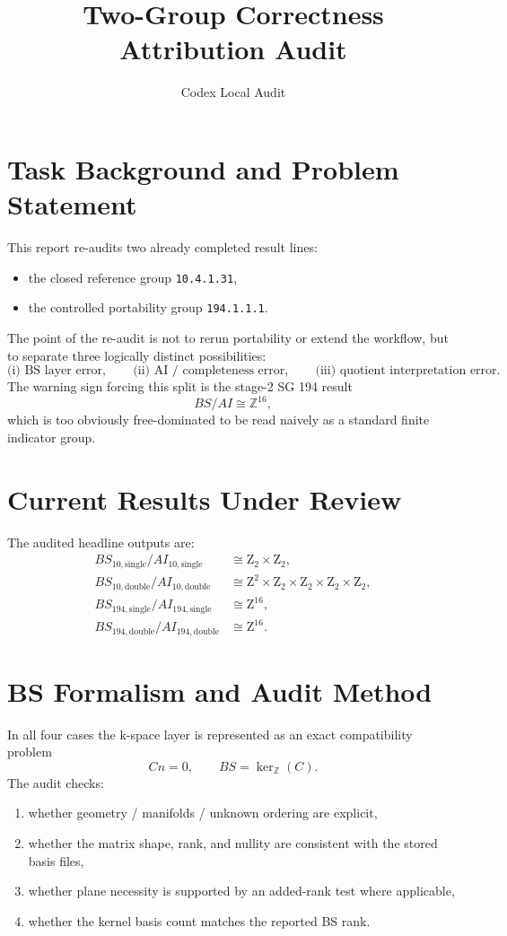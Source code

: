 \documentclass[11pt]{article}
\title{Two-Group Correctness Attribution Audit}
\author{Codex Local Audit}
\date{}
\begin{document}
\maketitle

\section{Task Background and Problem Statement}
This report re-audits two already completed result lines:
\begin{itemize}
\item the closed reference group \texttt{10.4.1.31},
\item the controlled portability group \texttt{194.1.1.1}.
\end{itemize}
The point of the re-audit is not to rerun portability or extend the workflow, but to separate three logically distinct possibilities:
\[
  \text{(i) BS layer error}, \qquad
  \text{(ii) AI / completeness error}, \qquad
  \text{(iii) quotient interpretation error}.
\]
The warning sign forcing this split is the stage-2 SG 194 result
\[
  BS/AI \cong \mathbb{Z}^{16},
\]
which is too obviously free-dominated to be read naively as a standard finite indicator group.

\section{Current Results Under Review}
The audited headline outputs are:
\begin{align*}
  BS_{10,\mathrm{single}}/AI_{10,\mathrm{single}} &\cong \mathrm{Z}_{2} \times \mathrm{Z}_{2}, \\
  BS_{10,\mathrm{double}}/AI_{10,\mathrm{double}} &\cong \mathrm{Z}^{2} \times \mathrm{Z}_{2} \times \mathrm{Z}_{2} \times \mathrm{Z}_{2} \times \mathrm{Z}_{2}, \\
  BS_{194,\mathrm{single}}/AI_{194,\mathrm{single}} &\cong \mathrm{Z}^{16}, \\
  BS_{194,\mathrm{double}}/AI_{194,\mathrm{double}} &\cong \mathrm{Z}^{16}.
\end{align*}

\section{BS Formalism and Audit Method}
In all four cases the k-space layer is represented as an exact compatibility problem
\[
  C n = 0,
  \qquad
  BS = \ker_{\mathbb{Z}}(C).
\]
The audit checks:
\begin{enumerate}
\item whether geometry / manifolds / unknown ordering are explicit,
\item whether the matrix shape, rank, and nullity are consistent with the stored basis files,
\item whether plane necessity is supported by an added-rank test where applicable,
\item whether the kernel basis count matches the reported BS rank.
\end{enumerate}
\end{document}

